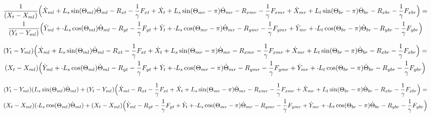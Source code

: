 \documentclass[11pt, landscape]{article}
\newcommand{\mn}{\scalebox{0.7}[1.0]{-}}
\begin{document}
\begin{multline}
\frac{1}{(X_{t } - X_{ml})} \Big( \dot{X}_{ml} + L_{s}\sin(\Theta_{ml})      \dot{\Theta}_{ml} - R_{xt } - \frac{1}{\gamma}F_{xt } + \dot{X}_{t } + L_{s}\sin(\Theta_{mr}-\pi)  \dot{\Theta}_{mr}
- R_{xmr} - \frac{1}{\gamma}F_{xmr} + \dot{X}_{mr} + L_{t}\sin(\Theta_{br}-\pi)  \dot{\Theta}_{br} - R_{xbr} - \frac{1}{\gamma}F_{xbr} \Big) = \\
\frac{1}{(Y_{t } - Y_{ml})} \Big( \dot{Y}_{ml} + \mn L_{s}\cos(\Theta_{ml})      \dot{\Theta}_{ml} - R_{yt} - \frac{1}{\gamma}F_{yt } + \dot{Y}_{t } + \mn L_{s}\cos(\Theta_{mr}-\pi)  \dot{\Theta}_{mr}
- R_{ymr} - \frac{1}{\gamma}F_{ymr} + \dot{Y}_{mr} + \mn L_{t}\cos(\Theta_{br}-\pi)  \dot{\Theta}_{br} - R_{ybr} - \frac{1}{\gamma}F_{ybr}\Big)
\end{multline}

\begin{multline}
(Y_{t } - Y_{ml}) \Big( \dot{X}_{ml} + L_{s}\sin(\Theta_{ml}) \dot{\Theta}_{ml} - R_{xt } - \frac{1}{\gamma}F_{xt } + \dot{X}_{t } + L_{s}\sin(\Theta_{mr}-\pi)  \dot{\Theta}_{mr}
- R_{xmr} - \frac{1}{\gamma}F_{xmr} + \dot{X}_{mr} + L_{t}\sin(\Theta_{br}-\pi)  \dot{\Theta}_{br} - R_{xbr} - \frac{1}{\gamma}F_{xbr} \Big) = \\
(X_{t } - X_{ml}) \Big( \dot{Y}_{ml} + \mn L_{s}\cos(\Theta_{ml}) \dot{\Theta}_{ml} - R_{yt} - \frac{1}{\gamma}F_{yt } + \dot{Y}_{t } + \mn L_{s}\cos(\Theta_{mr}-\pi)  \dot{\Theta}_{mr}
- R_{ymr} - \frac{1}{\gamma}F_{ymr} + \dot{Y}_{mr} + \mn L_{t}\cos(\Theta_{br}-\pi)  \dot{\Theta}_{br} - R_{ybr} - \frac{1}{\gamma}F_{ybr}\Big)
\end{multline}

\begin{multline}
(Y_{t } - Y_{ml})(L_{s}\sin(\Theta_{ml}) \dot{\Theta}_{ml}) + (Y_{t } - Y_{ml})\Big( \dot{X}_{ml} - R_{xt } - \frac{1}{\gamma}F_{xt } + \dot{X}_{t } + L_{s}\sin(\Theta_{mr}-\pi)  \dot{\Theta}_{mr}
- R_{xmr} - \frac{1}{\gamma}F_{xmr} + \dot{X}_{mr} + L_{t}\sin(\Theta_{br}-\pi)  \dot{\Theta}_{br} - R_{xbr} - \frac{1}{\gamma}F_{xbr} \Big) = \\
(X_{t } - X_{ml})(\mn L_{s}\cos(\Theta_{ml}) \dot{\Theta}_{ml}) + (X_{t } - X_{ml}) \Big( \dot{Y}_{ml} - R_{yt} - \frac{1}{\gamma}F_{yt } + \dot{Y}_{t } + \mn L_{s}\cos(\Theta_{mr}-\pi)  \dot{\Theta}_{mr}
- R_{ymr} - \frac{1}{\gamma}F_{ymr} + \dot{Y}_{mr} + \mn L_{t}\cos(\Theta_{br}-\pi)  \dot{\Theta}_{br} - R_{ybr} - \frac{1}{\gamma}F_{ybr}\Big)
\end{multline}
\end{document}
